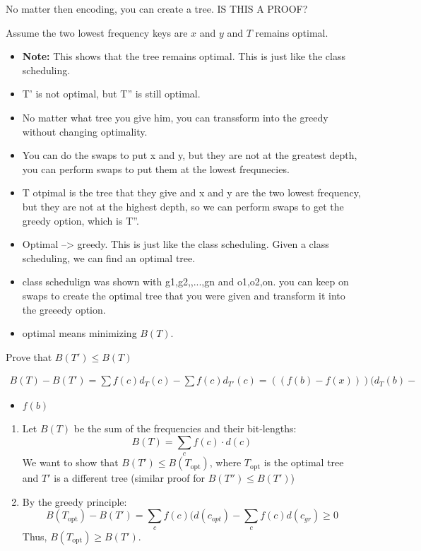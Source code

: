 No matter then encoding, you can create a tree. 
IS THIS A PROOF?
\begin{derivation}
    Assume the two lowest frequency keys are $x$ and $y$ and $T$ remains optimal. 
    \begin{itemize}
        \item \textbf{Note:} This shows that the tree remains optimal. This is just like the class scheduling. 
        \item T' is not optimal, but T'' is still optimal. 
        \item No matter what tree you give him, you can transsform into the greedy without changing optimality. 
        \item You can do the swaps to put x and y, but they are not at the greatest depth, you can perform swaps to put them at the lowest frequnecies. 
        \item T otpimal is the tree that they give and x and y are the two lowest frequency, but they are not at the highest depth, so we can perform swaps to get the greedy option, which is T''.
        \item Optimal --> greedy. This is just like the class scheduling. Given a class scheduling, we can find an optimal tree. 
        \item class schedulign was shown with g1,g2,,...,gn and o1,o2,on. you can keep on swaps to create the optimal tree that you were given and transform it into the greeedy option. 
        \item optimal means minimizing $B(T)$.
    \end{itemize}
    \vspace{1em}

    Prove that $B(T') \leq B(T)$

    \begin{align*}
        B(T) - B(T') = \sum f(c) d_T (c) - \sum f(c) d_{T'} (c) = ((f(b) - f(x))) (d_T (b) -
    \end{align*}
    \begin{itemize}
        \item $f(b)$
    \end{itemize}

    \begin{enumerate}
        \item Let $B(T)$ be the sum of the frequencies and their bit-lengths:
        \[
        B(T) = \sum_c f(c) \cdot d(c)
        \]
        We want to show that $B(T') \leq B(T_{\text{opt}})$, where $T_{\text{opt}}$ is the optimal tree and $T'$ is a different tree (similar proof for $B(T'') \leq B(T')$)
        \vspace{1em}
    
        \item By the greedy principle:
        \[
        B(T_{\text{opt}}) - B(T') = \sum_c f(c)(d(c_{opt}) - \sum_c f(c) d(c_{gr}) \geq 0
        \]
        Thus, $B(T_{\text{opt}}) \geq B(T')$.
    \end{enumerate}
\end{derivation}

